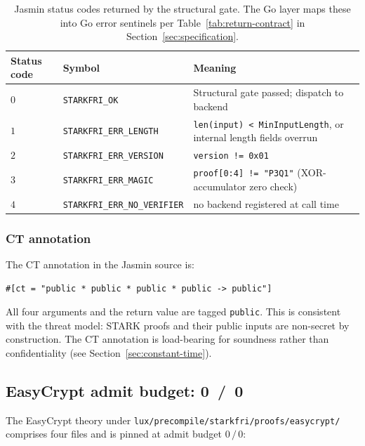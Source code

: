 \begin{table}[h]
\centering
\small
\begin{tabular}{@{}llp{6cm}@{}}
\toprule
\textbf{Status code} & \textbf{Symbol} & \textbf{Meaning} \\
\midrule
$0$  & \texttt{STARKFRI\_OK} & Structural gate passed; dispatch to backend \\
$1$  & \texttt{STARKFRI\_ERR\_LENGTH}  & \texttt{len(input) < MinInputLength}, or internal length fields overrun \\
$2$  & \texttt{STARKFRI\_ERR\_VERSION} & \texttt{version != 0x01} \\
$3$  & \texttt{STARKFRI\_ERR\_MAGIC}   & \texttt{proof[0:4] != "P3Q1"} (XOR-accumulator zero check) \\
$4$  & \texttt{STARKFRI\_ERR\_NO\_VERIFIER} & no backend registered at call time \\
\bottomrule
\end{tabular}
\caption{Jasmin status codes returned by the structural gate. The
Go layer maps these into Go error sentinels per
Table~\ref{tab:return-contract} in
Section~\ref{sec:specification}.}
\label{tab:jasmin-status}
\end{table}

\subsubsection{CT annotation}

The CT annotation in the Jasmin source is:

\begin{lstlisting}[language={}]
#[ct = "public * public * public * public -> public"]
\end{lstlisting}

All four arguments and the return value are tagged \texttt{public}.
This is consistent with the threat model: STARK proofs and their
public inputs are non-secret by construction. The CT annotation is
load-bearing for soundness rather than confidentiality (see
Section~\ref{sec:constant-time}).

\subsection{EasyCrypt admit budget: 0~/~0}

The EasyCrypt theory under
\texttt{lux/precompile/starkfri/proofs/easycrypt/} comprises four
files and is pinned at admit budget $0\,/\,0$:

